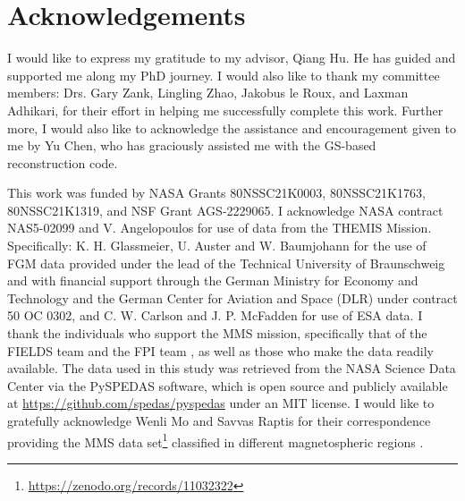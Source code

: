 \chapter{Acknowledgements}
\doublespacing


I would like to express my gratitude to my advisor, Qiang Hu. He has guided and supported me along my PhD journey. I would also like to thank my committee members: Drs. Gary Zank, Lingling Zhao, Jakobus le Roux, and Laxman Adhikari, for their effort in helping me successfully complete this work. Further more, I would also like to acknowledge the assistance and encouragement given to me by Yu Chen, who has graciously assisted me with the GS-based reconstruction code.

This work was funded by NASA Grants 80NSSC21K0003, 80NSSC21K1763, 80NSSC21K1319, and NSF Grant AGS‐2229065. I acknowledge NASA contract NAS5-02099 and V. Angelopoulos for use of data from the THEMIS Mission. Specifically: K. H. Glassmeier, U. Auster and W. Baumjohann for the use of FGM data \citep{Auster:2008} provided under the lead of the Technical University of Braunschweig and with financial support through the German Ministry for Economy and Technology and the German Center for Aviation and Space (DLR) under contract 50 OC 0302, and C. W. Carlson and J. P. McFadden for use of ESA \citep{McFadden:2008} data. I thank the individuals who support the MMS mission, specifically that of the FIELDS team \citep{Torbert:2016} and the FPI team \citep{Pollock:2016}, as well as those who make the data readily available. The data used in this study was retrieved from the NASA Science Data Center via the PySPEDAS software, which is open source and publicly available at \url{https://github.com/spedas/pyspedas} under an MIT license. I would like to gratefully acknowledge Wenli Mo and Savvas Raptis for their correspondence providing the MMS data set\footnote{\url{https://zenodo.org/records/11032322}} classified in different magnetospheric regions \citep{ToyEdens:2024}.


